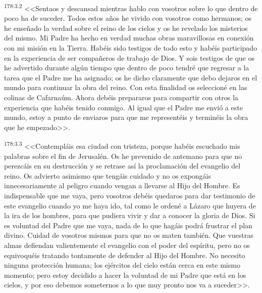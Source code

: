 \par 
\textsuperscript{178:3.2} <<Sentaos y descansad mientras hablo con vosotros sobre lo que dentro de poco ha de suceder. Todos estos años he vivido con vosotros como hermanos; os he enseñado la verdad sobre el reino de los cielos y os he revelado los misterios del mismo. Mi Padre ha hecho en verdad muchas obras maravillosas en conexión con mi misión en la Tierra. Habéis sido testigos de todo esto y habéis participado en la experiencia de ser compañeros de trabajo de Dios. Y sois testigos de que os he advertido durante algún tiempo que dentro de poco tendré que regresar a la tarea que el Padre me ha asignado; os he dicho claramente que debo dejaros en el mundo para continuar la obra del reino. Con esta finalidad os seleccioné en las colinas de Cafarnaúm. Ahora debéis prepararos para compartir con otros la experiencia que habéis tenido conmigo. Al igual que el Padre me envió a este mundo, estoy a punto de enviaros para que me representéis y terminéis la obra que he empezado>>.

\par 
\textsuperscript{178:3.3} <<Contempláis esa ciudad con tristeza, porque habéis escuchado mis palabras sobre el fin de Jerusalén. Os he prevenido de antemano para que no perezcáis en su destrucción y se retrase así la proclamación del evangelio del reino. Os advierto asimismo que tengáis cuidado y no os expongáis innecesariamente al peligro cuando vengan a llevarse al Hijo del Hombre. Es indispensable que me vaya, pero vosotros debéis quedaros para dar testimonio de este evangelio cuando yo me haya ido, tal como le ordené a Lázaro que huyera de la ira de los hombres, para que pudiera vivir y dar a conocer la gloria de Dios. Si es voluntad del Padre que me vaya, nada de lo que hagáis podrá frustrar el plan divino. Cuidad de vosotros mismos para que no os maten también. Que vuestras almas defiendan valientemente el evangelio con el poder del espíritu, pero no os equivoquéis tratando tontamente de defender al Hijo del Hombre. No necesito ninguna protección humana; los ejércitos del cielo están cerca en este mismo momento; pero estoy decidido a hacer la voluntad de mi Padre que está en los cielos, y por eso debemos someternos a lo que muy pronto nos va a suceder>>.

